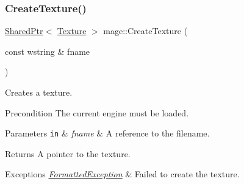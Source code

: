\hypertarget{namespacemage_ac27913e621bde0fd01312183aafaaca0}{}\label{namespacemage_ac27913e621bde0fd01312183aafaaca0} 
\subsubsection{\texorpdfstring{Create\+Texture()}{CreateTexture()}}
{\footnotesize\ttfamily \hyperlink{namespacemage_a1e01ae66713838a7a67d30e44c67703e}{Shared\+Ptr}$<$ \hyperlink{classmage_1_1_texture}{Texture} $>$ mage\+::\+Create\+Texture (\begin{DoxyParamCaption}\item[{const wstring \&}]{fname }\end{DoxyParamCaption})}

Creates a texture.

\begin{DoxyPrecond}{Precondition}
The current engine must be loaded. 
\end{DoxyPrecond}

\begin{DoxyParams}[1]{Parameters}
\mbox{\tt in}  & {\em fname} & A reference to the filename. \\
\hline
\end{DoxyParams}
\begin{DoxyReturn}{Returns}
A pointer to the texture. 
\end{DoxyReturn}

\begin{DoxyExceptions}{Exceptions}
{\em \hyperlink{structmage_1_1_formatted_exception}{Formatted\+Exception}} & Failed to create the texture. \\
\hline
\end{DoxyExceptions}
\hypertarget{namespacemage_a53fb464961d52002316f17c59ce58078}{}\label{namespacemage_a53fb464961d52002316f17c59ce58078} 
